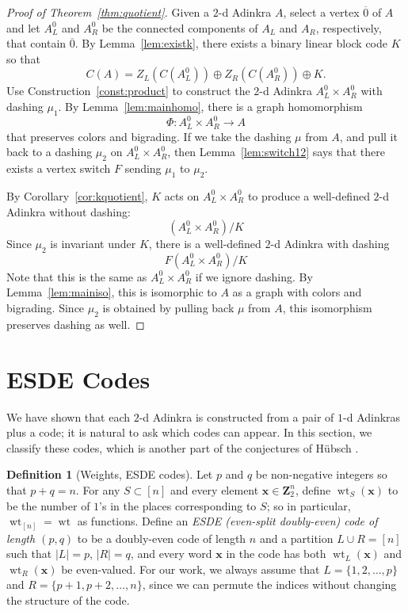 \documentclass[12pt,twoside,singlespace]{article}
\numberwithin{equation}{section}
\theoremstyle{definition}
\newtheorem{definition}[equation]{Definition}
\newcommand{\ZZ}{\mathbf{Z}}
\newcommand{\on}{\operatorname}
\newcommand{\wt}{\on{wt}}
\renewcommand{\vec}[1]{\mathbf{#1}}
\begin{document}
\begin{proof}[Proof of Theorem~\ref{thm:quotient}]
Given a $2$-d Adinkra $A$, select a vertex $\overline{0}$ of $A$ and let $A_L^0$ and $A_R^0$ be the connected components of $A_L$ and $A_R$, respectively, that contain $\overline{0}$.  By Lemma~\ref{lem:existk}, there exists a binary linear block code $K$ so that
\[C(A)=Z_L(C(A_L^0))\oplus Z_R(C(A_R^0))\oplus K.
\]
Use Construction~\ref{const:product} to construct the $2$-d Adinkra $A_L^0\times A_R^0$ with dashing $\mu_1$.
By Lemma~\ref{lem:mainhomo}, there is a graph homomorphism
\[\Phi:A_L^0\times A_R^0 \to A\]
that preserves colors and bigrading.  If we take the dashing $\mu$ from $A$, and pull it back to a dashing $\mu_2$ on $A_L^0\times A_R^0$, then Lemma~\ref{lem:switch12} says that there exists a vertex switch $F$ sending $\mu_1$ to $\mu_2$.

By Corollary~\ref{cor:kquotient}, $K$ acts on $A_L^0\times A_R^0$ to produce a well-defined $2$-d Adinkra without dashing:
\[(A_L^0\times A_R^0)/K\]
Since $\mu_2$ is invariant under $K$, there is a well-defined $2$-d Adinkra with dashing
\[F(A_L^0\times A_R^0)/K\]
Note that this is the same as $A_L^0\times A_R^0$ if we ignore dashing.  By Lemma~\ref{lem:mainiso}, this is isomorphic to $A$ as a graph with colors and bigrading.  Since $\mu_2$ is obtained by pulling back $\mu$ from $A$, this isomorphism preserves dashing as well.
\end{proof}



\section{ESDE Codes}

We have shown that each $2$-d Adinkra is constructed from a pair of $1$-d Adinkras plus a code; it is natural to ask which codes can appear. In this section, we classify these codes, which is another part of the conjectures of H\"ubsch \cite{hubsch:weaving}. 

\begin{definition}[Weights, ESDE codes]
Let $p$ and $q$ be non-negative integers so that $p+q=n$. For any $S \subset [n]$ and every element $\vec{x} \in \ZZ_2^n$, define $\wt_S(\vec{x})$ to be the number of $1$'s in the places corresponding to $S$; so in particular, $\wt_{[n]} = \wt$ as functions. Define an \emph{ESDE (even-split doubly-even) code of length $(p,q)$} to be a doubly-even code of length $n$ and a partition $L \cup R = [n]$ such that $|L| = p$, $|R| = q$, and every word $\vec{x}$ in the code has both $\wt_L(\vec{x})$ and $\wt_R(\vec{x})$ be even-valued. For our work, we always assume that $L = \{1, 2, \ldots, p\}$ and $R = \{p+1, p+2, \ldots, n\}$, since we can permute the indices without changing the structure of the code.
\end{definition}
\end{document}
